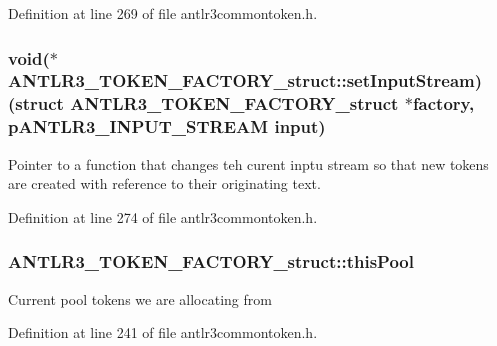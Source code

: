 Definition at line 269 of file antlr3commontoken.\-h.

\hypertarget{struct_a_n_t_l_r3___t_o_k_e_n___f_a_c_t_o_r_y__struct_a7ab10b5c63340112c1c0c5cff2c700bc}{
\subsubsection[{set\-Input\-Stream}]{\setlength{\rightskip}{0pt plus 5cm}void($\ast$ A\-N\-T\-L\-R3\-\_\-\-T\-O\-K\-E\-N\-\_\-\-F\-A\-C\-T\-O\-R\-Y\-\_\-struct\-::set\-Input\-Stream)(struct {\bf A\-N\-T\-L\-R3\-\_\-\-T\-O\-K\-E\-N\-\_\-\-F\-A\-C\-T\-O\-R\-Y\-\_\-struct} $\ast$factory, {\bf p\-A\-N\-T\-L\-R3\-\_\-\-I\-N\-P\-U\-T\-\_\-\-S\-T\-R\-E\-A\-M} {\bf input})}}\label{struct_a_n_t_l_r3___t_o_k_e_n___f_a_c_t_o_r_y__struct_a7ab10b5c63340112c1c0c5cff2c700bc}
Pointer to a function that changes teh curent inptu stream so that new tokens are created with reference to their originating text. 

Definition at line 274 of file antlr3commontoken.\-h.

\hypertarget{struct_a_n_t_l_r3___t_o_k_e_n___f_a_c_t_o_r_y__struct_affb2e4b787902103b05789ea9e6df0b6}{
\subsubsection[{this\-Pool}]{ A\-N\-T\-L\-R3\-\_\-\-T\-O\-K\-E\-N\-\_\-\-F\-A\-C\-T\-O\-R\-Y\-\_\-struct\-::this\-Pool}}\label{struct_a_n_t_l_r3___t_o_k_e_n___f_a_c_t_o_r_y__struct_affb2e4b787902103b05789ea9e6df0b6}
Current pool tokens we are allocating from 

Definition at line 241 of file antlr3commontoken.\-h.


